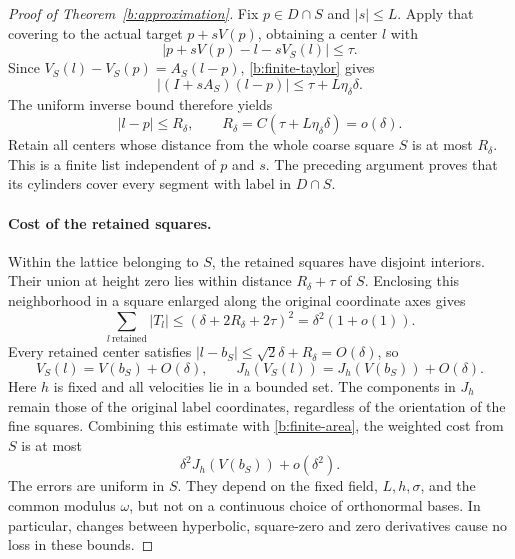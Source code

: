 \begin{proof}[Proof of Theorem~\ref{b:approximation}]
Fix $p\in D\cap S$ and $|s|\le L$. Apply that covering to
the actual target $p+sV(p)$, obtaining a center $l$ with
\[
 |p+sV(p)-l-sV_S(l)|\le\tau.
\]
Since $V_S(l)-V_S(p)=A_S(l-p)$,
\eqref{b:finite-taylor} gives
\[
 |(I+sA_S)(l-p)|\le\tau+L\eta_\delta\delta.
\]
The uniform inverse bound therefore yields
\begin{equation}\label{b:finite-retention}
 |l-p|\le R_\delta,
 \qquad R_\delta=C(\tau+L\eta_\delta\delta)=o(\delta).
\end{equation}
Retain all centers whose distance from the whole coarse square $S$
is at most $R_\delta$. This is a finite list independent of $p$
and $s$. The preceding argument proves that its cylinders cover
every segment with label in $D\cap S$.

\paragraph{Cost of the retained squares.}
Within the lattice belonging to $S$, the retained squares have
disjoint interiors. Their union at height zero lies within distance
$R_\delta+\tau$ of $S$. Enclosing this neighborhood in a square
enlarged along the original coordinate axes gives
\begin{equation}\label{b:finite-area}
 \sum_{l\ \mathrm{retained}}|T_l|
 \le(\delta+2R_\delta+2\tau)^2
 =\delta^2(1+o(1)).
\end{equation}
Every retained center satisfies
$|l-b_S|\le\sqrt2\delta+R_\delta=O(\delta)$, so
\[
 V_S(l)=V(b_S)+O(\delta),\qquad
 J_h(V_S(l))=J_h(V(b_S))+O(\delta).
\]
Here $h$ is fixed and all velocities lie in a bounded set. The
components in $J_h$ remain those of the original label coordinates,
regardless of the orientation of the fine squares. Combining this
estimate with \eqref{b:finite-area}, the weighted cost from $S$ is
at most
\begin{equation}\label{b:finite-square-cost}
 \delta^2J_h(V(b_S))+o(\delta^2).
\end{equation}
The errors are uniform in $S$. They depend on the fixed field,
$L,h,\sigma$, and the common modulus $\omega$, but not on a
continuous choice of orthonormal bases. In particular, changes
between hyperbolic, square-zero and zero derivatives cause no loss
in these bounds.


\end{proof}
